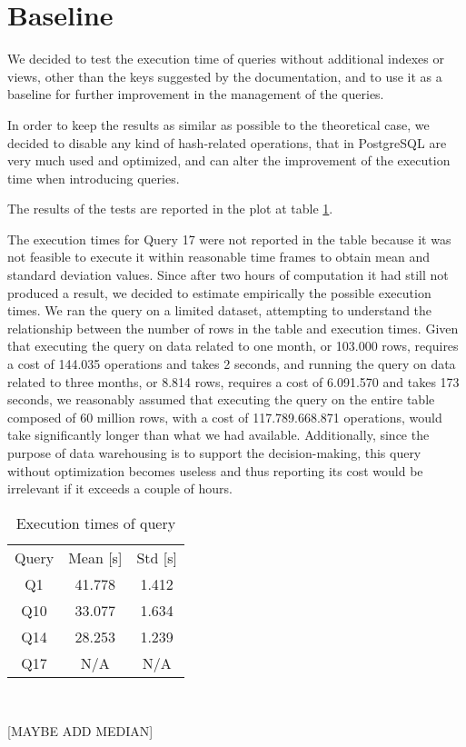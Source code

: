 \section{Baseline}

We decided to test the execution time of queries without additional indexes or views, other than the keys suggested by the documentation, and to use it as a baseline for further improvement in the management of the queries.

In order to keep the results as similar as possible to the theoretical case, we decided to disable any kind of hash-related operations, that in PostgreSQL are very much used and optimized, and can alter the improvement of the execution time when introducing queries.

The results of the tests are reported in the plot at table \ref{tab:baseline_exec_time}.


The execution times for Query 17 were not reported in the table because it was not feasible to execute it within reasonable time frames to obtain mean and standard deviation values. Since after two hours of computation it had still not produced a result, we decided to estimate empirically the possible execution times. We ran the query on a limited dataset, attempting to understand the relationship between the number of rows in the table and execution times. Given that executing the query on data related to one month, or 103.000 rows, requires a cost of 144.035 operations and takes 2 seconds, and running the query on data related to three months, or 8.814 rows, requires a cost of 6.091.570 and takes 173 seconds, we reasonably assumed that executing the query on the entire table composed of 60 million rows, with a cost of 117.789.668.871 operations, would take significantly longer than what we had available. Additionally, since the purpose of data warehousing is to support the decision-making, this query without optimization becomes useless and thus reporting its cost would be irrelevant if it exceeds a couple of hours.

\begin{table}[H]
\centering 
\begin{tabular}{c|c|c} 
\rowcolor{blue!50} Query & Mean [s] & Std [s] \\ 
\rowcolor{gray!10} Q1  & 41.778   & 1.412   \\
\rowcolor{white}   Q10 & 33.077   & 1.634   \\
\rowcolor{gray!10} Q14 & 28.253   & 1.239   \\
\rowcolor{white}   Q17 & N/A      & N/A     \\
\end{tabular}\\[0.5cm] 
\caption{Execution times of query} 
\label{tab:baseline_exec_time} 
\end{table}

[MAYBE ADD MEDIAN]